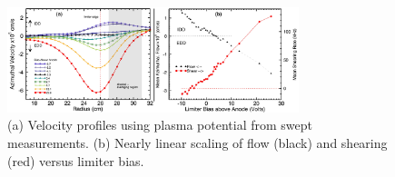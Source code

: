 \documentclass[%
 aps,
 prl,
 amsmath,amssymb,
 reprint,%
]{revtex4-1}
\begin{document}
\begin{figure}
\begin{center}
\includegraphics[width=8.5cm]{velocity_flowshear.pdf}%
\end{center}
\caption{\label{fig:velocity_flowshear} (a) Velocity profiles using plasma potential from swept measurements. (b) Nearly linear scaling of flow (black) and shearing (red) versus limiter bias.}
\end{figure}


\end{document}
